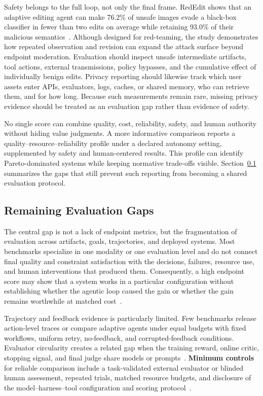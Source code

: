 Safety belongs to the full loop, not only the final frame. RedEdit shows that an adaptive editing agent can make 76.2\% of unsafe images evade a black-box classifier in fewer than two edits on average while retaining 93.0\% of their malicious semantics~\cite{avg260606140}. Although designed for red-teaming, the study demonstrates how repeated observation and revision can expand the attack surface beyond endpoint moderation. Evaluation should inspect unsafe intermediate artifacts, tool actions, external transmissions, policy bypasses, and the cumulative effect of individually benign edits. Privacy reporting should likewise track which user assets enter APIs, evaluators, logs, caches, or shared memory, who can retrieve them, and for how long. Because such measurements remain rare, missing privacy evidence should be treated as an evaluation gap rather than evidence of safety.

No single score can combine quality, cost, reliability, safety, and human authority without hiding value judgments. A more informative comparison reports a quality--resource--reliability profile under a declared autonomy setting, supplemented by safety and human-centered results. This profile can identify Pareto-dominated systems while keeping normative trade-offs visible. Section~\ref{subsec:evaluation-gaps} summarizes the gaps that still prevent such reporting from becoming a shared evaluation protocol.

\subsection{Remaining Evaluation Gaps}
\label{subsec:evaluation-gaps}

The central gap is not a lack of endpoint metrics, but the fragmentation of evaluation across artifacts, goals, trajectories, and deployed systems. Most benchmarks specialize in one modality or one evaluation level and do not connect final quality and constraint satisfaction with the decisions, failures, resource use, and human interventions that produced them. Consequently, a high endpoint score may show that a system works in a particular configuration without establishing whether the agentic loop caused the gain or whether the gain remains worthwhile at matched cost~\cite{avg250913399,avg260601057,avg260526144,avg260608091}.

Trajectory and feedback evidence is particularly limited. Few benchmarks release action-level traces or compare adaptive agents under equal budgets with fixed workflows, uniform retry, no-feedback, and corrupted-feedback conditions. Evaluator circularity creates a related gap when the training reward, online critic, stopping signal, and final judge share models or prompts~\cite{avg260211103,avg260601057,avg251123002}. \textbf{Minimum controls} for reliable comparison include a task-validated external evaluator or blinded human assessment, repeated trials, matched resource budgets, and disclosure of the model--harness--tool configuration and scoring protocol~\cite{avg260329139,avg250407046,avg260608091}.

